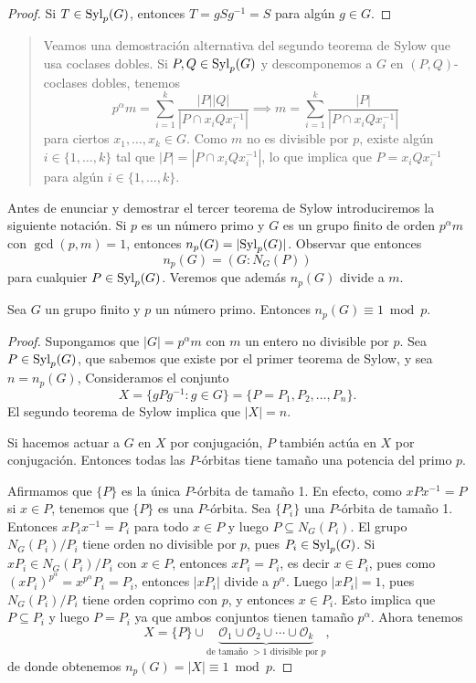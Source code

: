 \begin{proof}
Si $T\in\mathrm{Syl}_p(G)$, entonces $T=gSg^{-1}=S$ para algún $g\in G$. 	
\end{proof}

\begin{quote}
Veamos una 
demostración alternativa del segundo teorema de Sylow que usa coclases dobles. 
Si $P,Q\in\mathrm{Syl}_p(G)$ y 
descomponemos a $G$ en $(P,Q)$-coclases dobles, tenemos
\[
p^\alpha m=\sum_{i=1}^k\frac{|P||Q|}{|P\cap x_iQx_i^{-1}|}
\implies
m=\sum_{i=1}^k\frac{|P|}{|P\cap x_iQx_i^{-1}|}
\]
para ciertos $x_1,\dots,x_k\in G$. 
Como $m$ no es divisible por $p$, existe algún $i\in\{1,\dots,k\}$ tal que $|P|=|P\cap x_iQx_i^{-1}|$, lo que
implica que $P=x_iQx_i^{-1}$ para algún $i\in\{1,\dots,k\}$. 
\end{quote}

Antes de enunciar y demostrar el tercer teorema de Sylow introduciremos la siguiente notación. Si $p$ es un número primo y $G$ es un grupo finito de orden $p^\alpha m$ con $\gcd(p,m)=1$, entonces
$n_p(G)=|\mathrm{Syl}_p(G)|$. Observar que entonces 
\[
n_p(G)=(G:N_G(P))
\]
para cualquier $P\in\mathrm{Syl}_p(G)$. Veremos que además $n_p(G)$ divide a $m$. 

\begin{theorem}
Sea $G$ un grupo finito y $p$ un número primo. Entonces $n_p(G)\equiv 1\bmod p$. 	
\end{theorem}

\begin{proof}
    Supongamos que $|G|=p^{\alpha}m$ con $m$ un entero no divisible por $p$. 
	Sea $P\in\mathrm{Syl}_p(G)$, que sabemos que existe por el primer teorema de Sylow, y sea $n=n_p(G)$, Consideramos
	el conjunto
	\[
	X=\{gPg^{-1}:g\in G\}=\{P=P_1,P_2,\dots,P_n\}.
	\] 
    El segundo teorema de Sylow implica que $|X|=n$. 

	Si hacemos actuar a $G$ en $X$ por conjugación, $P$ también actúa en $X$ por conjugación. 
	Entonces todas las $P$-órbitas tiene tamaño una potencia del primo $p$. 
	
	Afirmamos que $\{P\}$ es la única $P$-órbita de tamaño 1. En efecto, como $xPx^{-1}=P$ si $x\in P$, tenemos que $\{P\}$ es una $P$-órbita. 
	Sea $\{P_i\}$ una $P$-órbita de tamaño 1. Entonces
	$xP_ix^{-1}=P_i$ para todo $x\in P$ y luego $P\subseteq N_G(P_i)$. El grupo
	$N_G(P_i)/P_i$ tiene orden no divisible por $p$, pues $P_i\in\mathrm{Syl}_p(G)$. 
	Si $xP_i\in N_G(P_i)/P_i$ con $x\in P$, entonces $xP_i=P_i$, es decir $x\in P_i$, pues
	como $(xP_i)^{p^{\alpha}}=x^{p^{\alpha}}P_i=P_i$, entonces $|xP_i|$ divide a $p^{\alpha}$. Luego $|xP_i|=1$, 
	pues $N_G(P_i)/P_i$ tiene orden coprimo con $p$, 
	y entonces $x\in P_i$. 
	Esto implica
	que $P\subseteq P_i$ y luego $P=P_i$ ya que ambos conjuntos tienen tamaño $p^{\alpha}$. Ahora tenemos 
	\[
	X=\{P\}\cup \underbrace{\mathcal{O}_1\cup\mathcal{O}_2\cup\cdots\cup\mathcal{O}_k}_{\text{de tamaño $>1$ divisible por $p$}},
	\]
	de donde obtenemos $n_p(G)=|X|\equiv 1\bmod p$. 
\end{proof}

